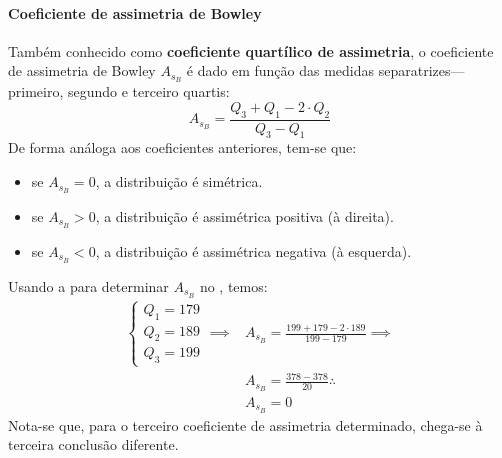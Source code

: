\paragraph{Coeficiente de assimetria de Bowley}
Também conhecido como \textbf{coeficiente quartílico de assimetria}, o
coeficiente de assimetria de Bowley $A_{s_B}$ é dado em função das medidas
separatrizes---primeiro, segundo e terceiro quartis:
\begin{equation}
    A_{s_B} = \frac{Q_3+Q_1-2 \cdot Q_2}{Q_3-Q_1}
    \label{eq:coef-ass-bowley}
\end{equation}
De forma análoga aos coeficientes anteriores, tem-se que:
\begin{itemize}
    \item se $A_{s_B}=0$, a distribuição é simétrica.
    \item se $A_{s_B}>0$, a distribuição é assimétrica positiva (à direita).
    \item se $A_{s_B}<0$, a distribuição é assimétrica negativa (à esquerda).
\end{itemize}
Usando a  para determinar $A_{s_B}$ no
, temos:
\begin{align*}
    \begin{cases}
        Q_1 = 179 \\
        Q_2 = 189 \\
        Q_3 = 199
    \end{cases} \implies
    &A_{s_B} = \frac{199+179-2 \cdot 189}{199-179} \implies \\
    &A_{s_B} = \frac{378-378}{20} \therefore \\
    &A_{s_B} = 0
\end{align*}
Nota-se que, para o terceiro coeficiente de assimetria determinado, chega-se à
terceira conclusão diferente.

